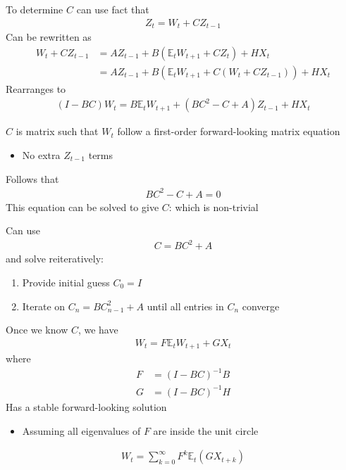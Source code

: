 \documentclass{beamer}
\begin{document}
\begin{frame} 
  To determine $C$ can use fact that 
 \begin{align}
   Z_t=W_t + CZ_{t-1}
 \end{align}
 \medskip
 Can be rewritten as 
 \begin{align}
  W_t + CZ_{t-1} &= AZ_{t-1} + B(\mathbb{E}_t W_{t+1} + CZ_t) + HX_t\\ \nonumber
  &= AZ_{t-1} + B(\mathbb{E}_t W_{t+1} + C(W_t+CZ_{t-1})) + HX_t  
  \end{align}
  Rearranges to  
  \begin{align}
    (I-BC)W_t = B\mathbb{E}_t W_{t+1} + (BC^2-C+A)Z_{t-1} + HX_t  
  \end{align}
\end{frame}

\begin{frame}
  $C$ is matrix such that $W_t$ follow a first-order forward-looking matrix equation
  \begin{itemize}
    \item No extra $Z_{t-1}$ terms 
  \end{itemize}
  \medskip
  Follows that 
\begin{align}
  BC^2-C+A=0
\end{align}
\medskip
This equation can be solved to give $C$: which is non-trivial 
\end{frame}

\begin{frame}
  Can use 
  \begin{align}
  C=BC^2+A
\end{align}
and solve reiteratively:
\begin{enumerate}
  \item Provide initial guess $C_0=I$
  \item Iterate on $C_n=BC^2_{n-1}+A$ until all entries in $C_n$ converge
\end{enumerate}  
\end{frame}


\begin{frame}
  Once we know $C$, we have
  \begin{align}
    W_t=F\mathbb{E}_t W_{t+1} + GX_t
  \end{align}
  where
  \begin{align}
      F &= (I-BC)^{-1}B\\
      G &= (I-BC)^{-1}H  
  \end{align}
  \medskip
  Has a stable forward-looking solution
  \begin{itemize}
    \item Assuming all eigenvalues of $F$ are inside the unit circle
  \end{itemize}
  \begin{align}
    W_t= \sum^{\infty}_{k=0} F^k\mathbb{E}_t(GX_{t+k})
  \end{align}  
\end{frame}
\end{document}
